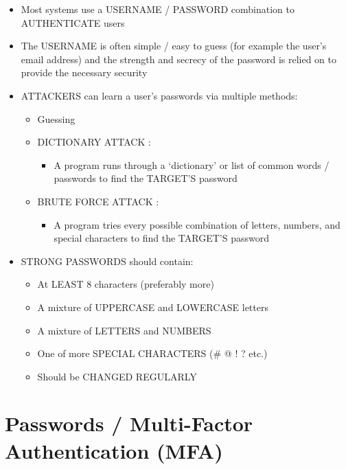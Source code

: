 \begin{itemize}
\tightlist
\item
  Most systems use a USERNAME / PASSWORD combination to AUTHENTICATE
  users
\item
  The USERNAME is often simple / easy to guess (for example the user's
  email address) and the strength and secrecy of the password is relied
  on to provide the necessary security
\item
  ATTACKERS can learn a user's passwords via multiple methods:

  \begin{itemize}
  \tightlist
  \item
    Guessing
  \item
    DICTIONARY ATTACK :

    \begin{itemize}
    \tightlist
    \item
      A program runs through a `dictionary' or list of common words /
      passwords to find the TARGET'S password
    \end{itemize}
  \item
    BRUTE FORCE ATTACK :

    \begin{itemize}
    \tightlist
    \item
      A program tries every possible combination of letters, numbers,
      and special characters to find the TARGET'S password
    \end{itemize}
  \end{itemize}
\item
  STRONG PASSWORDS should contain:

  \begin{itemize}
  \tightlist
  \item
    At LEAST 8 characters (preferably more)
  \item
    A mixture of UPPERCASE and LOWERCASE letters
  \item
    A mixture of LETTERS and NUMBERS
  \item
    One of more SPECIAL CHARACTERS (\# @ ! ? etc.)
  \item
    Should be CHANGED REGULARLY
  \end{itemize}
\end{itemize}

\section{Passwords / Multi-Factor Authentication
(MFA)}\label{passwords-multi-factor-authentication-mfa}

